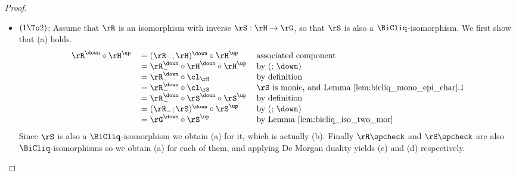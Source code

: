 \documentclass{article}
\begin{document}
\begin{proof}
\item
\begin{itemize}
\item
$(1 \To 2)$: Assume that $\rR$ is an isomorphism with inverse $\rS : \rH \to \rG$, so that $\rS$ is also a $\BiCliq$-isomorphism. We first show that (a) holds.
\[
\begin{tabular}{lll}
$\rR^\down \circ \rH^\up$
&
$= (\rR_- ; \rH)^\down \circ \rH^\up$
& associated component
\\&
$= \rR_-^\down \circ \rH^\down \circ \rH^\up$
& by $(;\,\down)$
\\&
$= \rR_-^\down \circ \cl_\rH$
& by definition
\\&
$= \rR_-^\down \circ \cl_\rS$
& $\rS$ is monic, and Lemma \ref{lem:bicliq_mono_epi_char}.1
\\&
$= \rR_-^\down \circ \rS^\down \circ \rS^\up$
& by definition
\\&
$= (\rR_- ; \rS)^\down \circ \rS^\up$
& by $(;\,\down)$
\\&
$= \rG^\down \circ \rS^\up$
& by Lemma \ref{lem:bicliq_iso_two_mor}
\end{tabular}
\]
Since $\rS$ is also a $\BiCliq$-isomorphism we obtain (a) for it, which is actually (b). Finally $\rR\spcheck$ and $\rS\spcheck$ are also $\BiCliq$-isomorphisms so we obtain (a) for each of them, and applying De Morgan duality  yields (c) and (d) respectively.


\end{itemize}
\end{proof}
\end{document}
